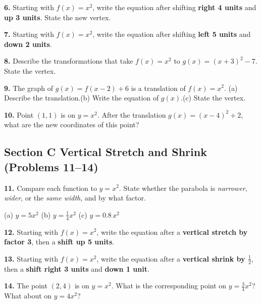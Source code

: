 \documentclass[11pt]{article}
\newcommand{\ws}[1][3cm]{\vspace{#1}}
\begin{document}
\textbf{6.} Starting with $f(x) = x^2$, write the equation after shifting \textbf{right 4 units} and \textbf{up 3 units}.
State the new vertex.

\ws[2.5cm]

\textbf{7.} Starting with $f(x) = x^2$, write the equation after shifting \textbf{left 5 units} and \textbf{down 2 units}.

\ws[2.5cm]

\textbf{8.} Describe the transformations that take $f(x) = x^2$ to $g(x) = (x + 3)^2 - 7$.
State the vertex.

\ws[2.5cm]

\textbf{9.} The graph of $g(x) = f(x - 2) + 6$ is a translation of $f(x) = x^2$.
\; (a) Describe the translation.\quad (b) Write the equation of $g(x)$.\quad (c) State the vertex.

\ws[3cm]

\textbf{10.} Point $(1, 1)$ is on $y = x^2$. After the translation $g(x) = (x-4)^2 + 2$, what are the
new coordinates of this point?

\ws[2.5cm]

\subsection*{Section C \quad Vertical Stretch and Shrink (Problems 11--14)}

\textbf{11.} Compare each function to $y = x^2$. State whether the parabola is \textit{narrower},
\textit{wider}, or the \textit{same width}, and by what factor.

\hspace{1cm}(a) $y = 5x^2$ \hspace{2.5cm} (b) $y = \tfrac{1}{4}x^2$
\hspace{2.5cm} (c) $y = 0.8\,x^2$

\ws[2.5cm]

\textbf{12.} Starting with $f(x) = x^2$, write the equation after a \textbf{vertical stretch by factor 3},
then a \textbf{shift up 5 units}.

\ws[2.5cm]

\textbf{13.} Starting with $f(x) = x^2$, write the equation after a \textbf{vertical shrink by $\tfrac{1}{2}$},
then a \textbf{shift right 3 units} and \textbf{down 1 unit}.

\ws[2.5cm]

\textbf{14.} The point $(2, 4)$ is on $y = x^2$. What is the corresponding point on $y = \tfrac{3}{4}x^2$?
What about on $y = 4x^2$?
\end{document}
